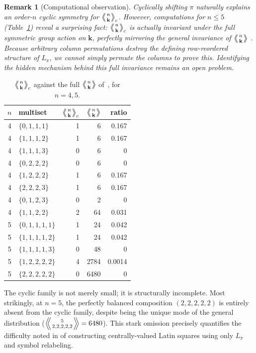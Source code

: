 \documentclass[11pt,a4paper]{amsart}
\newtheorem{remark}[theorem]{Remark}
\newcommand{\1}{\mathbf{1}}
\newcommand{\LE}[1]{\left\langle\!\!\left\langle #1 \right\rangle\!\!\right\rangle}
\newcommand{\LEc}[1]{\left\langle\!\!\left\langle #1 \right\rangle\!\!\right\rangle_c}
\begin{document}
\begin{remark}[Computational observation]
\label{rem:extra-sym}
Cyclically shifting $\pi$ naturally explains an order-$n$ cyclic symmetry for $\LEc{n \atop \mathbf{k}}$. However, computations for $n \le 5$ (Table~\ref{tab:cyclic-compare}) reveal a surprising fact: $\LEc{n \atop \mathbf{k}}$ is actually invariant under the \emph{full} symmetric group action on $\mathbf{k}$, perfectly mirroring the general invariance of $\LE{n \atop \mathbf{k}}$ \cite[Prop.~2.5]{LEN}. Because arbitrary column permutations destroy the defining row-reordered structure of $L_\pi$, we cannot simply permute the columns to prove this. Identifying the hidden mechanism behind this full invariance remains an open problem.
\end{remark}



\begin{table}[h]
\centering
\begin{tabular}{@{}c l r r r@{}}
\toprule
$n$ & multiset & $\LE{n\atop\mathbf k}_c$ & $\LE{n\atop\mathbf k}$ & ratio \\
\midrule
4 & $\{0,1,1,1\}$ & 1 & 6 & 0.167 \\
4 & $\{1,1,1,2\}$ & 1 & 6 & 0.167 \\
4 & $\{1,1,1,3\}$ & 0 & 6 & 0 \\
4 & $\{0,2,2,2\}$ & 0 & 6 & 0 \\
4 & $\{1,2,2,2\}$ & 1 & 6 & 0.167 \\
4 & $\{2,2,2,3\}$ & 1 & 6 & 0.167 \\
4 & $\{0,1,2,3\}$ & 0 & 2 & 0 \\
4 & $\{1,1,2,2\}$ & 2 & 64 & 0.031 \\
5 & $\{0,1,1,1,1\}$ & 1 & 24 & 0.042 \\
5 & $\{1,1,1,1,2\}$ & 1 & 24 & 0.042 \\
5 & $\{1,1,1,1,3\}$ & 0 & 48 & 0 \\
5 & $\{1,2,2,2,2\}$ & 4 & 2784 & 0.0014 \\
5 & $\{2,2,2,2,2\}$ & 0 & 6480 & 0 \\
\bottomrule
\end{tabular}
\caption{$\LE{n\atop\mathbf k}_c$ against the full $\LE{n\atop\mathbf k}$ of~\cite{LEN}, for $n=4,5$.}
\label{tab:cyclic-compare}
\end{table}
The cyclic family is not merely small; it is structurally incomplete. Most strikingly, at $n=5$, the perfectly balanced composition $(2,2,2,2,2)$ is entirely absent from the cyclic family, despite being the unique mode of the general distribution ($\LE{5 \atop 2,2,2,2,2} = 6480$). This stark omission precisely quantifies the difficulty noted in \cite{LEN} of constructing centrally-valued Latin squares using only $L_\pi$ and symbol relabeling.
\end{document}

